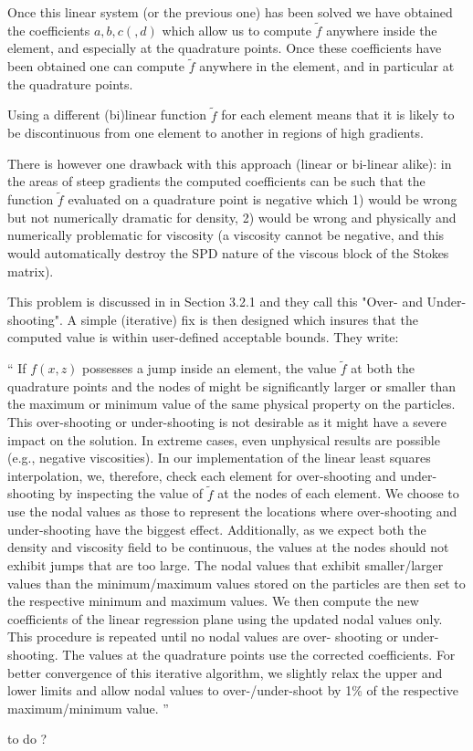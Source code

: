 \documentclass[a4paper,12pt]{article}
\begin{document}
Once this linear system (or the previous one) has been solved we have obtained the coefficients $a,b,c(,d)$ 
which allow us to compute $\tilde{f}$ anywhere inside the element, and especially 
at the quadrature points. Once these coefficients have been obtained one can compute $\tilde{f}$
anywhere in the element, and in particular at the quadrature points.  

Using a different (bi)linear function $\tilde{f}$ for each element 
means that it is likely to be discontinuous 
from one element to another in regions of high gradients. 

There is however one drawback with this approach (linear or bi-linear alike):
in the areas of steep gradients the computed coefficients can be such that 
the function $\tilde{f}$ evaluated on a quadrature point 
is negative  which 1) would be wrong but not numerically 
dramatic for density, 2) would be wrong and physically and numerically 
problematic for viscosity (a viscosity cannot be negative, and this would 
automatically destroy the SPD nature of the viscous block of the Stokes matrix).

This problem is discussed in \textcite{thmk14} in Section 3.2.1 and they 
call this "Over- and Under-shooting". A simple (iterative) 
fix is then designed which insures that the computed value is within user-defined 
acceptable bounds. 
They write:
\begin{displayquote}
``
If $f(x,z)$ possesses a jump inside an element, the value $\tilde{f}$ 
at both the quadrature points and the nodes of 
might be significantly larger or smaller than the
maximum or minimum value of the same physical
property on the particles. This over-shooting or
under-shooting is not desirable as it might have a
severe impact on the solution. In extreme cases, even
unphysical results are possible (e.g., negative viscosities). 
In our implementation of the linear least
squares interpolation, we, therefore, check each
element for over-shooting and under-shooting by
inspecting the value of $\tilde{f}$ at the nodes of each
element. We choose to use the nodal values as those
to represent the locations where over-shooting and
under-shooting have the biggest effect. Additionally,
as we expect both the density and viscosity field to be
continuous, the values at the nodes should not exhibit
jumps that are too large. The nodal values that exhibit
smaller/larger values than the minimum/maximum
values stored on the particles are then set to the
respective minimum and maximum values. We then
compute the new coefficients of the linear regression
plane using the updated nodal values only. This
procedure is repeated until no nodal values are over-
shooting or under-shooting. The values at the quadrature 
points use the corrected coefficients. For better
convergence of this iterative algorithm, we slightly
relax the upper and lower limits and allow nodal
values to over-/under-shoot by 1\% of the respective
maximum/minimum value.
''
\end{displayquote}
{\color{red} to do ?}
\end{document}
